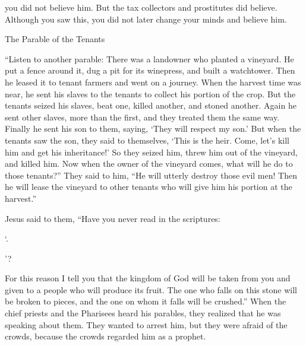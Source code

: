 {you did
not
believe
him.
But
the tax collectors
and
prostitutes
did believe.
Although you
saw
this, you did
not
later
change
your minds
and believe
him.
\par }{\SH The Parable of the Tenants
\par }{\PP {}“Listen
to another
parable: There
was
a landowner
who
planted
a vineyard.
He
put
a fence around
it,
dug
a pit for its winepress,
and
built
a watchtower.
Then
he leased
it
to tenant farmers
and
went on a journey.
When
the harvest
time
was near,
he sent
his
slaves
to
the tenants
to collect
his
portion of the crop.
But
the tenants
seized
his
slaves,
beat
one, killed
another, and stoned another.
Again
he sent
other
slaves,
more than
the first,
and
they treated
them
the same way.
Finally
he sent
his
son
to them,
saying,
‘They will respect
my
son.’
But
when
the tenants
saw
the son,
they said
to
themselves,
‘This
is
the heir.
Come,
let’s kill
him
and
get
his
inheritance!’
So
they seized
him,
threw
him out
of the vineyard,
and
killed him.
Now
when
the owner
of the vineyard
comes,
what
will he do
to those
tenants?”
They said
to him,
“He will
utterly
destroy
those evil men! Then he will lease
the vineyard
to other
tenants
who
will give
him
his
portion
at
the harvest.”
\par }{\PP {}Jesus
said
to them,
“Have you
never
read
in
the scriptures:
\par }{\Q ‘{}.
\par }{’?
\par }{\PP {}For
this
reason I tell
you
that
the kingdom
of God
will be taken
from
you
and
given
to a people
who will produce
its
fruit.
The one who falls
on
this
stone
will be broken to pieces,
and the one on
whom
it falls
will be crushed.”
When
the chief priests
and
the Pharisees
heard
his
parables,
they realized
that
he was speaking
about
them.
They wanted
to arrest
him,
but they were afraid
of the crowds,
because
the crowds regarded
him
as
a prophet.

}
